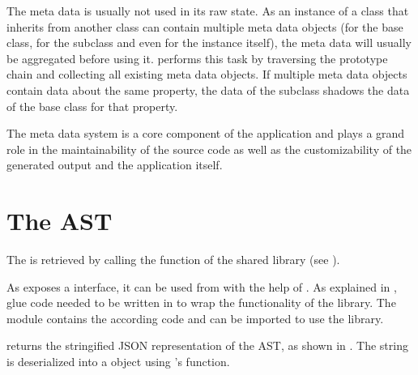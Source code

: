 The meta data is usually not used in its raw state. As an instance of a class that inherits from another class can contain multiple meta data objects (for the base class, for the subclass and even for the instance itself), the meta data will usually be aggregated before using it.  performs this task by traversing the prototype chain and collecting all existing meta data objects. If multiple meta data objects contain data about the same property, the data of the subclass shadows the data of the base class for that property.

The meta data system is a core component of the application and plays a grand role in the maintainability of the source code as well as the customizability of the generated output and the application itself.

\section{The  AST}
\label{sec:CPPAST}

The  is retrieved by calling the  function of the  shared library (see ).

As  exposes a  interface, it can be used from  with the help of . As explained in , glue code needed to be written in  to wrap the functionality of the library. The  module contains the according code and can be imported to use the  library.

 returns the stringified JSON representation of the  AST, as shown in . The string is deserialized into a  object using 's  function.


